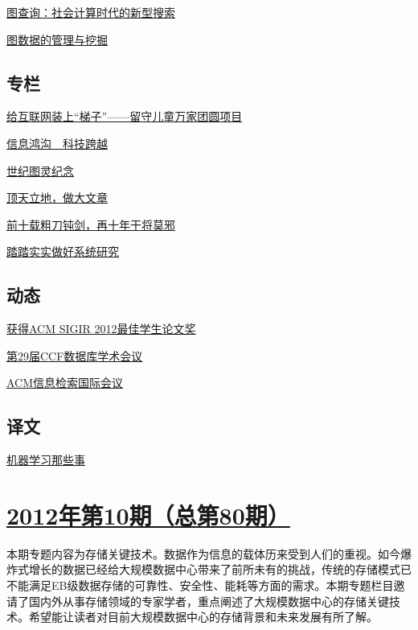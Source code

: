 \documentclass[a4paper]{article}
\begin{document}
\href{http://history.ccf.org.cn/resources/1190201776262/2012/11/16/5.pdf}{图查询：社会计算时代的新型搜索}

\href{http://history.ccf.org.cn/resources/1190201776262/2012/11/16/1.pdf}{图数据的管理与挖掘}

\subsection{专栏}
\href{http://history.ccf.org.cn/resources/1190201776262/2012/11/16/8.pdf}{给互联网装上“梯子”——留守儿童万家团圆项目}

\href{http://history.ccf.org.cn/resources/1190201776262/2012/11/16/9.pdf}{信息鸿沟　科技跨越}

\href{http://history.ccf.org.cn/resources/1190201776262/2012/11/16/7.pdf}{世纪图灵纪念}

\href{http://history.ccf.org.cn/resources/1190201776262/2012/11/16/12.pdf}{顶天立地，做大文章}

\href{http://history.ccf.org.cn/resources/1190201776262/2012/11/16/10.pdf}{前十载粗刀钝剑，再十年干将莫邪}

\href{http://history.ccf.org.cn/resources/1190201776262/2012/11/16/11.pdf}{踏踏实实做好系统研究}

\subsection{动态}
\href{http://history.ccf.org.cn/resources/1190201776262/2012/11/16/15.pdf}{获得ACM SIGIR 2012最佳学生论文奖}

\href{http://history.ccf.org.cn/resources/1190201776262/2012/11/16/13.pdf}{第29届CCF数据库学术会议}

\href{http://history.ccf.org.cn/resources/1190201776262/2012/12/26/201211-兰艳艳.pdf}{ACM信息检索国际会议}

\subsection{译文}
\href{http://history.ccf.org.cn/resources/1190201776262/2012/11/16/16.pdf}{机器学习那些事}


\section{\href{http://history.ccf.org.cn/sites/ccf/jsjtbbd.jsp?contentId=2700838126422}{\textbf{2012年第10期（总第80期）}}}
本期专题内容为存储关键技术。数据作为信息的载体历来受到人们的重视。如今爆炸式增长的数据已经给大规模数据中心带来了前所未有的挑战，传统的存储模式已不能满足EB级数据存储的可靠性、安全性、能耗等方面的需求。本期专题栏目邀请了国内外从事存储领域的专家学者，重点阐述了大规模数据中心的存储关键技术。希望能让读者对目前大规模数据中心的存储背景和未来发展有所了解。
\end{document}
